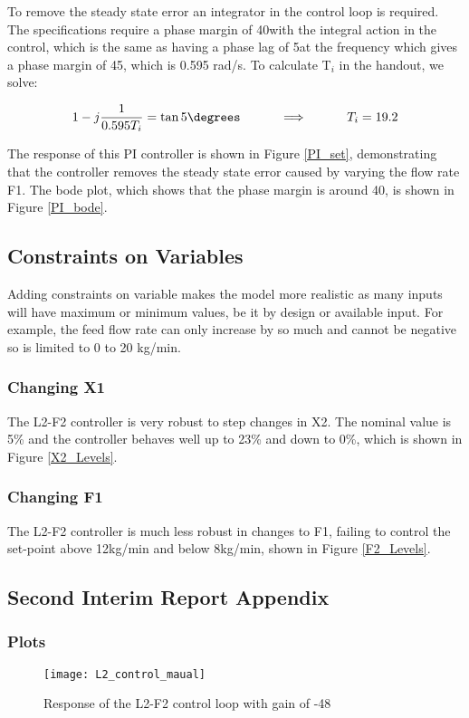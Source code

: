 \documentclass[11pt]{article}
\begin{document}
To remove the steady state error an integrator in the control loop is required. The specifications require a phase margin of 40\degree with the integral action in the control, which is the same as having a phase lag of 5\degree at the frequency which gives a phase margin of 45\degree, which is 0.595 rad/s. To calculate T$_i$ in the handout, we solve:

\begin{gather*}
1 - j\frac{1}{0.595T_i} = \tan5\degrees \hspace{1cm} \implies \hspace{1cm} T_i = 19.2
\end{gather*}

The response of this PI controller is shown in Figure \ref{PI_set}, demonstrating that the controller removes the steady state error caused by varying the flow rate F1. The bode plot, which shows that the phase margin is around 40\degree, is shown in Figure \ref{PI_bode}.

\subsection{Constraints on Variables}
Adding constraints on variable makes the model more realistic as many inputs will have maximum or minimum values, be it by design or available input. For example, the feed flow rate can only increase by so much and cannot be negative so is limited to 0 to 20 kg/min.

\subsubsection{Changing X1}
The L2-F2 controller is very robust to step changes in X2. The nominal value is 5\% and the controller behaves well up to 23\% and down to 0\%, which is shown in Figure \ref{X2_Levels}.

\subsubsection{Changing F1}
The L2-F2 controller is much less robust in changes to F1, failing to control the set-point above 12kg/min and below 8kg/min, shown in Figure \ref{F2_Levels}.

\subsection{Second Interim Report Appendix}

\subsubsection{Plots}
\begin{figure} [H]
\centering	\texttt{[image: L2\_control\_maual]}
\caption{Response of the L2-F2 control loop with gain of -48}
\label{L2_man}
\end{figure}
\end{document}
